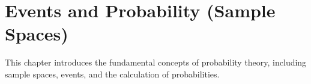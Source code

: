 \chapter{Events and Probability (Sample Spaces)}

This chapter introduces the fundamental concepts of probability theory, including sample spaces, events, and the calculation of probabilities.

